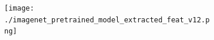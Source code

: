 \documentclass[letterpaper]{article} %
\begin{document}
\begin{figure}[t]
\centering
\begin{subfigure}{0.36\textwidth}
\centering
\texttt{[image: ./imagenet\_pretrained\_model\_extracted\_feat\_v12.png]} 
\caption{}
\end{subfigure}
\\
\begin{subfigure}{0.144\textwidth}
\centering
{}
\caption{}
\end{subfigure}
\quad
\begin{subfigure}{0.117\textwidth}
\centering
{}

\end{subfigure}
\end{figure}
\end{document}
